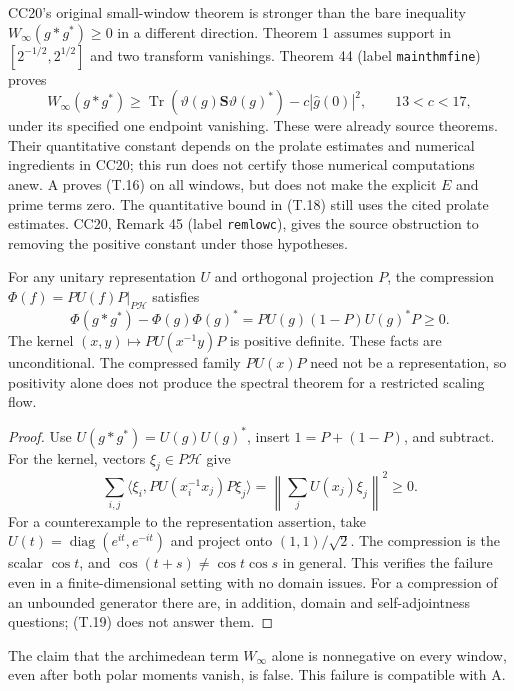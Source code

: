 CC20's original small-window theorem is stronger than
the bare inequality \(W_\infty(g*g^*)\geq0\) in a
different direction. Theorem 1 assumes support in
\([2^{-1/2},2^{1/2}]\) and two transform vanishings.
Theorem 44 (label \texttt{mainthmfine}) proves
\[
 W_\infty(g*g^*)\geq
 \operatorname{Tr}(\vartheta(g)\mathbf S\vartheta(g)^*)
                   -c|\widehat g(0)|^2,\qquad 13<c<17,
                                                               \tag{T.18}
\]
under its specified one endpoint vanishing. These
were already source theorems. Their quantitative
constant depends on the prolate estimates and
numerical ingredients in CC20; this run does not
certify those numerical computations anew.
A proves (T.16) on all windows, but does not make
the explicit \(E\) and prime terms zero. The quantitative bound in (T.18) still uses the
cited prolate estimates. CC20, Remark 45
(label \texttt{remlowc}), gives the source
obstruction to removing the positive constant
under those hypotheses.

\begin{proposition}
\label{AC-T08}
For any unitary representation \(U\) and orthogonal
projection \(P\), the compression
\(\Phi(f)=PU(f)P|_{P\mathcal H}\) satisfies
\[
 \Phi(g*g^*)-\Phi(g)\Phi(g)^*
   =PU(g)(1-P)U(g)^*P\geq0.                                  \tag{T.19}
\]
The kernel \((x,y)\mapsto PU(x^{-1}y)P\) is positive
definite. These facts are unconditional. The
compressed family \(PU(x)P\) need not be a
representation, so positivity alone does not
produce the spectral theorem for a restricted
scaling flow.
\end{proposition}

\begin{proof}
Use \(U(g*g^*)=U(g)U(g)^*\), insert \(1=P+(1-P)\),
and subtract. For the kernel, vectors
\(\xi_j\in P\mathcal H\) give
\[
 \sum_{i,j}\langle\xi_i,PU(x_i^{-1}x_j)P\xi_j\rangle
  =\left\|\sum_j U(x_j)\xi_j\right\|^2\geq0.
\]
For a counterexample to the representation assertion,
take \(U(t)=\operatorname{diag}(e^{it},e^{-it})\)
and project onto \((1,1)/\sqrt2\). The compression
is the scalar \(\cos t\), and
\(\cos(t+s)\ne\cos t\cos s\) in general.
This verifies the failure even in a finite-dimensional
setting with no domain issues. For a compression of
an unbounded generator there are, in addition,
domain and self-adjointness questions; (T.19)
does not answer them.
\end{proof}

\begin{proposition}
\label{AC-T09}
The claim that the archimedean term \(W_\infty\)
alone is nonnegative on every window, even after
both polar moments vanish, is false. This failure
is compatible with A.
\end{proposition}


